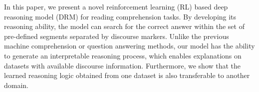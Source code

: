In this paper, we present a novel reinforcement learning (RL) based deep reasoning model (DRM) for reading comprehension tasks. By developing its reasoning ability, the model can search for the correct answer within the set of pre-defined segments separated by discourse markers. Unlike the previous machine comprehension or question answering methods, our model has the ability to generate an interpretable reasoning process, which enables explanations on datasets with available discourse information. Furthermore, we show that the learned reasoning logic obtained from one dataset is also transferable to another domain.
